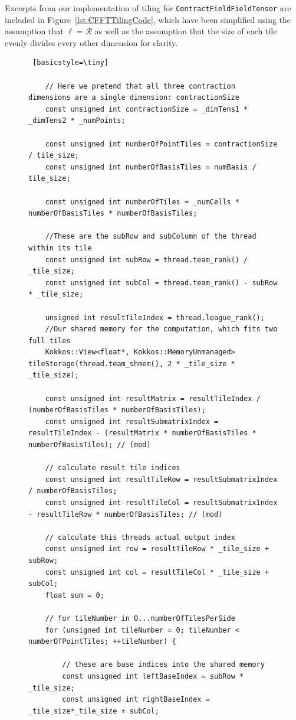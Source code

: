 Excerpts from our implementation of tiling for \texttt{ContractFieldFieldTensor} are included in Figure~\ref{lst:CFFTTilingCode}, which have been simplified using the assumption that $\ell=\mathcal{R}$ as well as the assumption that the size of each tile evenly divides every other dimension for clarity. 

\begin{figure}[H]
    \begin{lstlisting} [basicstyle=\tiny]

    // Here we pretend that all three contraction dimensions are a single dimension: contractionSize
    const unsigned int contractionSize = _dimTens1 * _dimTens2 * _numPoints;
    
    const unsigned int numberOfPointTiles = contractionSize / tile_size;
    const unsigned int numberOfBasisTiles = numBasis / tile_size;

    const unsigned int numberOfTiles = _numCells * numberOfBasisTiles * numberOfBasisTiles;
    
    //These are the subRow and subColumn of the thread within its tile
    const unsigned int subRow = thread.team_rank() / _tile_size;
    const unsigned int subCol = thread.team_rank() - subRow * _tile_size;

    unsigned int resultTileIndex = thread.league_rank();
    //Our shared memory for the computation, which fits two full tiles
    Kokkos::View<float*, Kokkos::MemoryUnmanaged> tileStorage(thread.team_shmem(), 2 * _tile_size * _tile_size);

    const unsigned int resultMatrix = resultTileIndex / (numberOfBasisTiles * numberOfBasisTiles);
    const unsigned int resultSubmatrixIndex = resultTileIndex - (resultMatrix * numberOfBasisTiles * numberOfBasisTiles); // (mod)

    // calculate result tile indices
    const unsigned int resultTileRow = resultSubmatrixIndex / numberOfBasisTiles;
    const unsigned int resultTileCol = resultSubmatrixIndex - resultTileRow * numberOfBasisTiles; // (mod)

    // calculate this threads actual output index
    const unsigned int row = resultTileRow * _tile_size + subRow;
    const unsigned int col = resultTileCol * _tile_size + subCol;
    float sum = 0;

    // for tileNumber in 0...numberOfTilesPerSide
    for (unsigned int tileNumber = 0; tileNumber < numberOfPointTiles; ++tileNumber) {

        // these are base indices into the shared memory
        const unsigned int leftBaseIndex = subRow * _tile_size;
        const unsigned int rightBaseIndex = _tile_size*_tile_size + subCol;


\end{lstlisting}
\end{figure}
